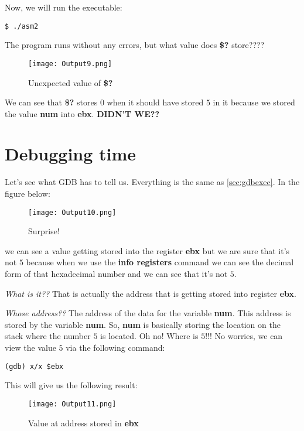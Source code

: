 \documentclass{article}
\makeatletter
\renewcommand\paragraph{\@startsection{paragraph}{4}{\z@}{-3.25ex \@plus -1ex \@minus -.2ex}{1.5ex \@plus .2ex}{\normalfont\normalsize\bfseries}}
\makeatother
\begin{document}
Now, we will run the executable:

\begin{Verbatim}[frame=single]
$ ./asm2
\end{Verbatim}

The program runs without any errors, but what value does \textbf{\$?} store????

\begin{figure}[h]
\centering
\texttt{[image: Output9.png]}
\caption{Unexpected value of \textbf{\$?}}
\end{figure}

We can see that \textbf{\$?} stores $0$ when it should have stored $5$ in it because we stored the value \textbf{num} into \textbf{ebx}. \textbf{DIDN'T WE??}

\section{Debugging time}\label{sec:debugging}
\paragraph{}
Let's see what GDB has to tell us.
Everything is the same as \autoref{sec:gdbexec}.
\newpage
In the figure below:
\begin{figure}[h]
\centering
\texttt{[image: Output10.png]}
\caption{Surprise!}
\label{fig:surprise}
\end{figure}

we can see a value getting stored into the register \textbf{ebx} but we are sure that it's not $5$ because when we use the \textbf{info registers} command we can see the decimal form of that hexadecimal number and we can see that it's not $5$. 

\textit{What is it??} That is actually the address that is getting stored into register \textbf{ebx}.

\textit{Whose address??} The address of the data for the variable \textbf{num}. This address is stored by the variable \textbf{num}. So, \textbf{num} is basically storing the location on the stack where the number $5$ is located. Oh no! Where is $5$!!! No worries, we can view the value $5$ via the following command:

\begin{Verbatim}[frame=single]
(gdb) x/x $ebx
\end{Verbatim}
This will give us the following result:
\begin{figure}[h]
\centering
\texttt{[image: Output11.png]}
\caption{Value at address stored in \textbf{ebx}}
\end{figure}
\end{document}
